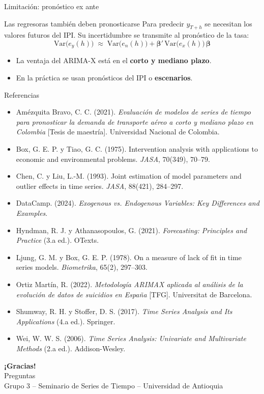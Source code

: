 \documentclass[aspectratio=169,11pt]{beamer}
\begin{document}
\begin{frame}[t]{Limitación: pronóstico ex ante}
  \begin{alertblock}{Las regresoras también deben pronosticarse}
    Para predecir $y_{T+h}$ se necesitan los valores futuros del IPI. Su incertidumbre se transmite al pronóstico de la tasa:
    \[
      \mathrm{Var}\big(e_y(h)\big) \;\approx\; \mathrm{Var}\big(e_n(h)\big) + \bm{\beta}'\,\mathrm{Var}\big(e_x(h)\big)\,\bm{\beta}
    \]
  \end{alertblock}
  \vspace{2mm}
  \begin{itemize}
    \item La ventaja del ARIMA-X está en el \textbf{corto y mediano plazo}.
    \item En la práctica se usan pronósticos del IPI o \textbf{escenarios}.
  \end{itemize}
\end{frame}

\begin{frame}[t]{Referencias}
  \footnotesize
  \begin{itemize}
    \item Amézquita Bravo, C. C. (2021). \emph{Evaluación de modelos de series de tiempo para pronosticar la demanda de transporte aéreo a corto y mediano plazo en Colombia} [Tesis de maestría]. Universidad Nacional de Colombia.
    \item Box, G. E. P. y Tiao, G. C. (1975). Intervention analysis with applications to economic and environmental problems. \emph{JASA}, 70(349), 70--79.
    \item Chen, C. y Liu, L.-M. (1993). Joint estimation of model parameters and outlier effects in time series. \emph{JASA}, 88(421), 284--297.
    \item DataCamp. (2024). \emph{Exogenous vs. Endogenous Variables: Key Differences and Examples}.
    \item Hyndman, R. J. y Athanasopoulos, G. (2021). \emph{Forecasting: Principles and Practice} (3.a ed.). OTexts.
    \item Ljung, G. M. y Box, G. E. P. (1978). On a measure of lack of fit in time series models. \emph{Biometrika}, 65(2), 297--303.
    \item Ortiz Martín, R. (2022). \emph{Metodología ARIMAX aplicada al análisis de la evolución de datos de suicidios en España} [TFG]. Universitat de Barcelona.
    \item Shumway, R. H. y Stoffer, D. S. (2017). \emph{Time Series Analysis and Its Applications} (4.a ed.). Springer.
    \item Wei, W. W. S. (2006). \emph{Time Series Analysis: Univariate and Multivariate Methods} (2.a ed.). Addison-Wesley.
  \end{itemize}
\end{frame}

\begin{frame}[plain]
  \centering
  \vspace{2cm}
  {\Huge\bfseries ¡Gracias!}\\[6mm]
  {\large Preguntas}\\[10mm]
  {\small Grupo 3 -- Seminario de Series de Tiempo -- Universidad de Antioquia}
\end{frame}
\end{document}
